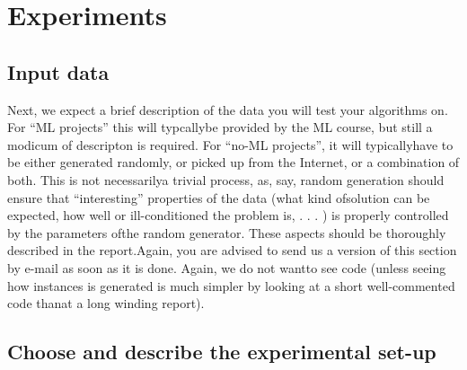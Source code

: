 \section{Experiments}

\subsection{Input data}

Next, we expect a brief description of the data you will test your algorithms on. For “ML projects” this will typcallybe provided by the ML course, but still a modicum of descripton is required. For “no-ML projects”, it will typicallyhave to be either generated randomly, or picked up from the Internet, or a combination of both. This is not necessarilya trivial process, as, say, random generation should ensure that “interesting” properties of the data (what kind ofsolution can be expected, how well or ill-conditioned the problem is, . . . ) is properly controlled by the parameters ofthe random generator. These aspects should be thoroughly described in the report.Again, you are advised to send us a version of this section by e-mail as soon as it is done. Again, we do not wantto see code (unless seeing how instances is generated is much simpler by looking at a short well-commented code thanat a long winding report).

\subsection{Choose and describe the experimental set-up}

